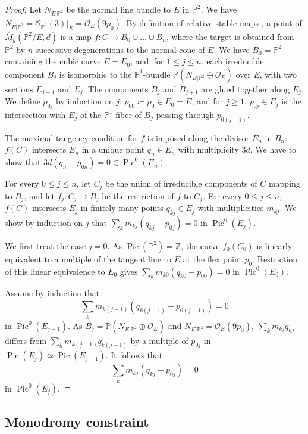 \documentclass[11pt,letterpaper]{amsart}
\newcommand\PP{\mathbb P}
\newcommand\Z{\mathbb Z}
\newcommand\cO{\mathcal O}
\newcommand\Pic{\operatorname{Pic}}
\begin{document}
\begin{proof}
Let $N_{E|\PP^2}$ be the normal line bundle to $E$ in $\PP^2$. We have 
$N_{E|\PP^2}=\cO_{\PP^2}(3)|_E=\cO_E(9p_0)$.
By definition of relative stable maps \cite{MR1882667, MR1938113},
a point of 
$\overline{M}_{g}(\PP^2/E,d)$
is a map $f \colon C \rightarrow 
B_0 \cup \dots \cup B_n$, where 
the target is obtained from $\PP^2$
by $n$ successive degenerations to the normal cone of $E$.
We have $B_0 =\PP^2$ containing the cubic curve $E=E_0$, and, for 
$1\leqslant j \leqslant n$, each irreducible component $B_j$ is isomorphic to the 
$\PP^1$-bundle $\PP(N_{E|\PP^2} \oplus \cO_E)$ over $E$, with two sections 
$E_{j-1}$ and $E_j$. The components $B_j$ and $B_{j+1}$ are glued together along $E_j$.
We define $p_{0j}$ by induction on $j$:
$p_{00} \coloneq p_0 \in E_0=E$, and for $j
\geqslant 1$, $p_{0j} \in E_j$ is the intersection with $E_j$ of the $\PP^1$-fiber of 
$B_j$ passing through $p_{0(j-1)}$.

The maximal tangency condition for $f$ is imposed along the divisor $E_n$ in $B_n$:
$f(C)$ intersects $E_n$ in a unique point 
$q_n \in E_n$ with multiplicity $3d$.
We have to show that $3d(q_n-p_{0n})
=0 \in \Pic^0(E_n)$.

For every $0 \leqslant j \leqslant n$, 
let $C_j$ be the union of irreducible components of $C$ mapping to $B_j$, and let $f_j \colon C_j \rightarrow B_j$ be the 
restriction of $f$ to $C_j$.
For every $0 \leqslant j \leqslant n$, $f(C)$ intersects $E_j$ in finitely many points 
$q_{kj}\in E_j$ with multiplicities $m_{kj}$. We show by induction on $j$ that
$\sum_k m_{kj}(q_{kj}-p_{0j})
=0$ in $\Pic^0(E_j)$.

We first treat the case $j=0$.
As $\Pic(\PP^2)=\Z$, the curve $f_0(C_0)$ is linearly equivalent to a 
multiple of the tangent line to $E$ at the flex point $p_0$. Restriction of this linear equivalence to $E_0$ gives
$\sum_k m_{k0}(q_{k0}-p_{00})
=0$ in $\Pic^0(E_0)$.

Assume by induction that 
\[\sum_k m_{k(j-1)}(q_{k(j-1)}-p_{0(j-1)})
=0\] 
in $\Pic^0(E_{j-1})$. 
As $B_j=\PP(N_{E|\PP^2} \oplus \cO_E)$
and $N_{E|\PP^2}=\cO_E(9p_0)$, 
$\sum_k m_{kj} q_{kj}$ differs from
$\sum_k m_{k(j-1)} q_{k(j-1)}$
by a multiple of $p_{0j}$
in $\Pic(E_j) \simeq \Pic(E_{j-1})$.
It follows that
\[\sum_k m_{kj}(q_{kj}-p_{0j})
=0\] 
in $\Pic^0(E_{j})$.


\end{proof}

\subsection{Monodromy constraint}
\label{section_monodromy}
\end{document}
